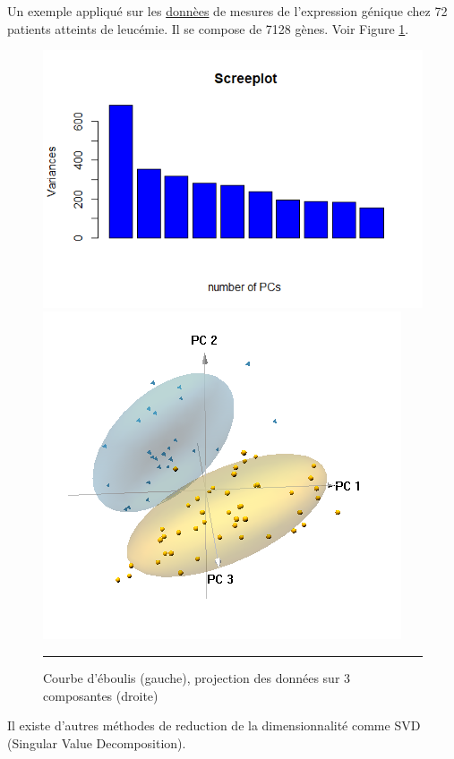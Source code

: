 \begin{example}
Un exemple appliqué sur  les \href{1http://web.stanford.edu/ hastie/CASIles/DATA/leukemia big.csv}{donnèes} de mesures de l'expression génique chez 72 patients atteints de leucémie. Il se compose de 7128 gènes. Voir Figure \ref{fig0}.
\begin{figure}[t]
    \centering
     \includegraphics[width=.5\textwidth]{ADOA/Images/screeleuk.png}
    \includegraphics[width=.4\textwidth]{ADOA/Images/3dpcleuk.PNG}
    \caption{Courbe d'éboulis (gauche), projection des données sur 3 composantes (droite)}\hrule
    \label{fig0}
\end{figure}
\end{example}
Il existe d'autres méthodes de reduction de la dimensionnalité comme
SVD (Singular Value Decomposition).
